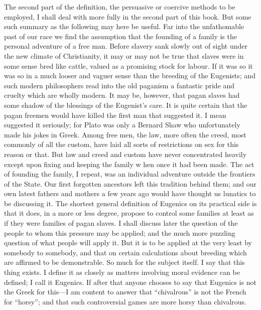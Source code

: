 \documentclass{book}
\begin{document}
The second part of the definition, the persuasive or coercive methods to be employed, I shall deal with more fully in the second part of this book. But some such summary as the following may here be useful. Far into the unfathomable past of our race we find the assumption that the founding of a family is the personal adventure of a free man. Before slavery sank slowly out of sight under the new climate of Christianity, it may or may not be true that slaves were in some sense bred like cattle, valued as a promising stock for labour. If it was so it was so in a much looser and vaguer sense than the breeding of the Eugenists; and such modern philosophers read into the old paganism a fantastic pride and cruelty which are wholly modern. It may be, however, that pagan slaves had some shadow of the blessings of the Eugenist’s care. It is quite certain that the pagan freemen would have killed the first man that suggested it. I mean suggested it seriously; for Plato was only a Bernard Shaw who unfortunately made his jokes in Greek. Among free men, the law, more often the creed, most commonly of all the custom, have laid all sorts of restrictions on sex for this reason or that. But law and creed and custom have never concentrated heavily except upon fixing and keeping the family w hen once it had been made. The act of founding the family, I repeat, was an individual adventure outside the frontiers of the State. Our first forgotten ancestors left this tradition behind them; and our own latest fathers and mothers a few years ago would have thought us lunatics to be discussing it. The shortest general definition of Eugenics on its practical side is that it does, in a more or less degree, propose to control some families at least as if they were families of pagan slaves. I shall discuss later the question of the people to whom this pressure may be applied; and the much more puzzling question of what people will apply it. But it is to be applied at the very least by somebody to somebody, and that on certain calculations about breeding which are affirmed to be demonstrable. So much for the subject itself. I say that this thing exists. I define it as closely as matters involving moral evidence can be defined; I call it Eugenics. If after that anyone chooses to say that Eugenics is not the Greek for this—I am content to answer that “chivalrous” is not the French for “horsy”; and that such controversial games are more horsy than chivalrous.
\end{document}
